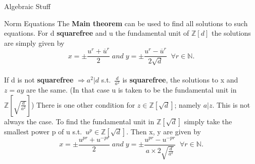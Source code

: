 \documentclass[12pt, letterpaper]{article}
\newcommand{\Z}{\mathbb{Z}}
\newcommand{\N}{\mathbb{N}}
\begin{document}
\begin{section}{Algebraic Stuff}
\begin{subsection}{Norm Equations}
    The \textbf{Main theorem} can be used to find all solutions to such
    equations. For d \textbf{squarefree} and u the fundamental unit of
    \(\Z[d]\) the solutions are simply given by \[x = \pm
      \frac{u^{r} + \overline{u} ^{r}}{2} \; and \; y = \pm \frac{u^{r} -
        \overline{u}^{r}}{2 \sqrt{d}} \;\; \forall r \in \N.\] \\
    If d is not \textbf{squarefree} \(\Rightarrow a^{2} | d\) s.t.\
    \(\frac{d}{a^{2}}\) is \textbf{squarefree}, the solutions to x and
    \(z = ay\) are the same.
    (In that case u is taken to be the fundamental unit in \(\Z
    [\sqrt{\frac{d}{a^{2}}}]\))
    There is one other condition for \(z \in \Z[\sqrt{d}]\); namely
    \(a|z\). This is not always the case. To find the fundamental unit in
    \(\Z[\sqrt{d}]\) simply take the smallest power p of u s.t.\
    \(u^{p} \in \Z[\sqrt{d}]\). Then x, y are given by \[x = \pm
      \frac{u^{pr} + u^{-pr}}{2} \; and \; y = \pm \frac{u^{pr} - u^{-pr}}{a \times
        2 \sqrt{\frac{d}{a^{2}}}} \;\; \forall r \in \N.\]

  \end{subsection}

\end{section}
\end{document}
